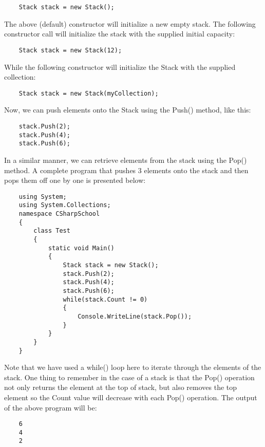 \begin{lstlisting}
    Stack stack = new Stack();    
\end{lstlisting}

The above (default) constructor will initialize a new empty stack. The following constructor call will initialize the
stack with the supplied initial capacity:

\begin{lstlisting}
    Stack stack = new Stack(12);    
\end{lstlisting}

While the following constructor will initialize the Stack with the supplied collection:

\begin{lstlisting}
    Stack stack = new Stack(myCollection);
\end{lstlisting}

Now, we can push elements onto the Stack using the Push() method, like this:

\begin{lstlisting}
    stack.Push(2);
    stack.Push(4);
    stack.Push(6);    
\end{lstlisting}

In a similar manner, we can retrieve elements from the stack using the Pop() method. A complete program that
pushes 3 elements onto the stack and then pops them off one by one is presented below:

\begin{lstlisting}
    using System;
    using System.Collections;
    namespace CSharpSchool
    {
        class Test
        {
            static void Main()
            {
                Stack stack = new Stack();
                stack.Push(2);
                stack.Push(4);
                stack.Push(6);
                while(stack.Count != 0)
                {
                    Console.WriteLine(stack.Pop());
                }
            }
        }
    }    
\end{lstlisting}

Note that we have used a while() loop here to iterate through the elements of the stack. One thing to remember in
the case of a stack is that the Pop() operation not only returns the element at the top of stack, but also removes the
top element so the Count value will decrease with each Pop() operation. The output of the above program will be:

\begin{lstlisting}
    6
    4
    2        
\end{lstlisting}

